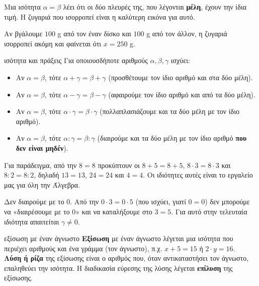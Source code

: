 

Μια ισότητα $\alpha=\beta$ λέει ότι οι δύο πλευρές της, που λέγονται \textbf{μέλη}, έχουν την ίδια τιμή. Η ζυγαριά που ισορροπεί είναι η καλύτερη εικόνα για αυτό.

\begin{center}
\quad\raisebox{6mm}{$\Rightarrow$}\quad
{}
\end{center}

Αν βγάλουμε $100$ g από τον έναν δίσκο και $100$ g από τον άλλον, η ζυγαριά ισορροπεί ακόμη και φαίνεται ότι $x=250$ g.

\begin{idiotita}{ισότητα και πράξεις}
Για οποιουσδήποτε αριθμούς $\alpha,\beta,\gamma$ ισχύει:
\begin{itemize}[leftmargin=1.2em,itemsep=0.3ex,topsep=2pt]
\item Αν $\alpha=\beta$, τότε $\alpha+\gamma=\beta+\gamma$ (προσθέτουμε τον ίδιο αριθμό και στα δύο μέλη).
\item Αν $\alpha=\beta$, τότε $\alpha-\gamma=\beta-\gamma$ (αφαιρούμε τον ίδιο αριθμό και από τα δύο μέλη).
\item Αν $\alpha=\beta$, τότε $\alpha\cdot\gamma=\beta\cdot\gamma$ (πολλαπλασιάζουμε και τα δύο μέλη με τον ίδιο αριθμό).
\item Αν $\alpha=\beta$, τότε $\alpha:\gamma=\beta:\gamma$ (διαιρούμε και τα δύο μέλη με τον ίδιο αριθμό \textbf{που δεν είναι μηδέν}).
\end{itemize}
\end{idiotita}

Για παράδειγμα, από την $8=8$ προκύπτουν οι $8+5=8+5$, $8\cdot3=8\cdot3$ και $8:2=8:2$, δηλαδή $13=13$, $24=24$ και $4=4$. Οι ιδιότητες αυτές είναι το εργαλείο μας για όλη την Άλγεβρα.

\begin{prosoxi}
Δεν διαιρούμε με το $0$. Από την $0\cdot3=0\cdot5$ (που ισχύει, γιατί $0=0$) δεν μπορούμε να «διαιρέσουμε με το $0$» και να καταλήξουμε στο $3=5$. Για αυτό στην τελευταία ιδιότητα απαιτείται $\gamma\neq0$.
\end{prosoxi}


\begin{orismos}{εξίσωση με έναν άγνωστο}
\textbf{Εξίσωση} με έναν άγνωστο λέγεται μια ισότητα που περιέχει αριθμούς και ένα γράμμα (τον άγνωστο), π.χ. $x+5=15$ ή $2\cdot y=16$.\\
\textbf{Λύση ή ρίζα} της εξίσωσης είναι ο αριθμός που, όταν αντικαταστήσει τον άγνωστο, επαληθεύει την ισότητα. Η διαδικασία εύρεσης της λύσης λέγεται \textbf{επίλυση} της εξίσωσης.
\end{orismos}

